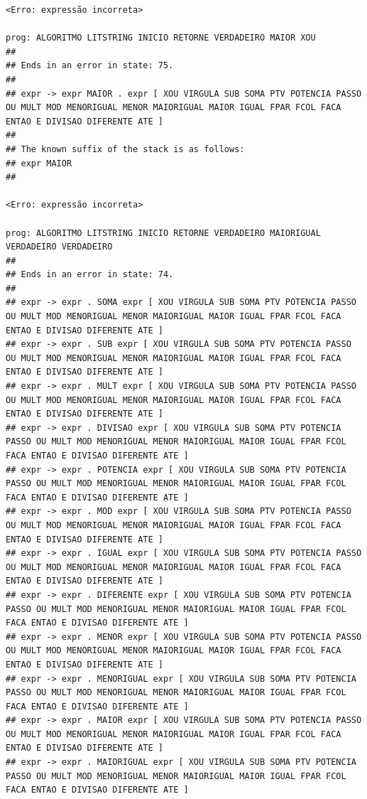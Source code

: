 \documentclass[hidelinks,12pt]{article}
\begin{document}
\begin{lstlisting}
<Erro: expressão incorreta>

prog: ALGORITMO LITSTRING INICIO RETORNE VERDADEIRO MAIOR XOU 
##
## Ends in an error in state: 75.
##
## expr -> expr MAIOR . expr [ XOU VIRGULA SUB SOMA PTV POTENCIA PASSO OU MULT MOD MENORIGUAL MENOR MAIORIGUAL MAIOR IGUAL FPAR FCOL FACA ENTAO E DIVISAO DIFERENTE ATE ]
##
## The known suffix of the stack is as follows:
## expr MAIOR 
##

<Erro: expressão incorreta>

prog: ALGORITMO LITSTRING INICIO RETORNE VERDADEIRO MAIORIGUAL VERDADEIRO VERDADEIRO 
##
## Ends in an error in state: 74.
##
## expr -> expr . SOMA expr [ XOU VIRGULA SUB SOMA PTV POTENCIA PASSO OU MULT MOD MENORIGUAL MENOR MAIORIGUAL MAIOR IGUAL FPAR FCOL FACA ENTAO E DIVISAO DIFERENTE ATE ]
## expr -> expr . SUB expr [ XOU VIRGULA SUB SOMA PTV POTENCIA PASSO OU MULT MOD MENORIGUAL MENOR MAIORIGUAL MAIOR IGUAL FPAR FCOL FACA ENTAO E DIVISAO DIFERENTE ATE ]
## expr -> expr . MULT expr [ XOU VIRGULA SUB SOMA PTV POTENCIA PASSO OU MULT MOD MENORIGUAL MENOR MAIORIGUAL MAIOR IGUAL FPAR FCOL FACA ENTAO E DIVISAO DIFERENTE ATE ]
## expr -> expr . DIVISAO expr [ XOU VIRGULA SUB SOMA PTV POTENCIA PASSO OU MULT MOD MENORIGUAL MENOR MAIORIGUAL MAIOR IGUAL FPAR FCOL FACA ENTAO E DIVISAO DIFERENTE ATE ]
## expr -> expr . POTENCIA expr [ XOU VIRGULA SUB SOMA PTV POTENCIA PASSO OU MULT MOD MENORIGUAL MENOR MAIORIGUAL MAIOR IGUAL FPAR FCOL FACA ENTAO E DIVISAO DIFERENTE ATE ]
## expr -> expr . MOD expr [ XOU VIRGULA SUB SOMA PTV POTENCIA PASSO OU MULT MOD MENORIGUAL MENOR MAIORIGUAL MAIOR IGUAL FPAR FCOL FACA ENTAO E DIVISAO DIFERENTE ATE ]
## expr -> expr . IGUAL expr [ XOU VIRGULA SUB SOMA PTV POTENCIA PASSO OU MULT MOD MENORIGUAL MENOR MAIORIGUAL MAIOR IGUAL FPAR FCOL FACA ENTAO E DIVISAO DIFERENTE ATE ]
## expr -> expr . DIFERENTE expr [ XOU VIRGULA SUB SOMA PTV POTENCIA PASSO OU MULT MOD MENORIGUAL MENOR MAIORIGUAL MAIOR IGUAL FPAR FCOL FACA ENTAO E DIVISAO DIFERENTE ATE ]
## expr -> expr . MENOR expr [ XOU VIRGULA SUB SOMA PTV POTENCIA PASSO OU MULT MOD MENORIGUAL MENOR MAIORIGUAL MAIOR IGUAL FPAR FCOL FACA ENTAO E DIVISAO DIFERENTE ATE ]
## expr -> expr . MENORIGUAL expr [ XOU VIRGULA SUB SOMA PTV POTENCIA PASSO OU MULT MOD MENORIGUAL MENOR MAIORIGUAL MAIOR IGUAL FPAR FCOL FACA ENTAO E DIVISAO DIFERENTE ATE ]
## expr -> expr . MAIOR expr [ XOU VIRGULA SUB SOMA PTV POTENCIA PASSO OU MULT MOD MENORIGUAL MENOR MAIORIGUAL MAIOR IGUAL FPAR FCOL FACA ENTAO E DIVISAO DIFERENTE ATE ]
## expr -> expr . MAIORIGUAL expr [ XOU VIRGULA SUB SOMA PTV POTENCIA PASSO OU MULT MOD MENORIGUAL MENOR MAIORIGUAL MAIOR IGUAL FPAR FCOL FACA ENTAO E DIVISAO DIFERENTE ATE ]

\end{lstlisting}
\end{document}
